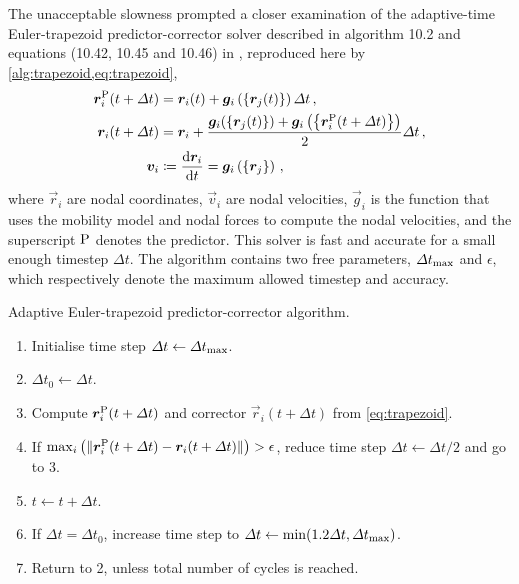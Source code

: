 The unacceptable slowness prompted a closer examination of the adaptive-time Euler-trapezoid predictor-corrector solver described in algorithm 10.2 and equations (10.42, 10.45 and 10.46) in \cite[p.~214--216]{ddlab}, reproduced here by \cref{alg:trapezoid,eq:trapezoid},
\begin{align}\label{eq:trapezoid}
    \vec{r}_i^{\rvar{P}}(t + \Delta t) & = \vec{r}_i(t) + \vec{g}_i\left(\left\{ \vec{r}_j(t) \right\}\right) \Delta t\,,                                                                     \\
    \vec{r}_i(t + \Delta t)            & = \vec{r}_i + \dfrac{\vec{g}_i(\left\{\vec{r}_j(t)\right\}) + \vec{g}_i\left(\left\{\vec{r}_i^{\rvar{P}}(t + \Delta t)\right\}\right)}{2}\Delta t\,, \\
    \vec{v}_i                          & \coloneqq \dfrac{\rvar{d}\vec{r}_i}{\rvar{d}t} = \vec{g}_i\left(\left\{\vec{r}_j\right\}\right)\,,
\end{align}
where $\vec{r}_i$ are nodal coordinates, $\vec{v}_i$ are nodal velocities, $\vec{g}_i$ is the function that uses the mobility model and nodal forces to compute the nodal velocities, and the superscript $\textrm{P}$ denotes the predictor. This solver is fast and accurate for a small enough timestep $\Delta t$. The algorithm contains two free parameters, $\Delta t_{\textrm{max}}$ and $\epsilon$, which respectively denote the maximum allowed timestep and accuracy.
\begin{algorithm}
    \caption{Adaptive Euler-trapezoid predictor-corrector algorithm.}
    \label{alg:trapezoid}
    \begin{enumerate}
        \item Initialise time step $\Delta t \gets \Delta t_{\textrm{max}}$.
        \item $\Delta t_0 \gets \Delta t$.
        \item Compute $\vec{r}_i^{\rvar{P}}(t + \Delta t)$ and corrector $\vec{r}_i(t + \Delta t)$ from \cref{eq:trapezoid}.
        \item If $\max_i\left(\lVert \vec{r}_i^{\rvar{P}}(t + \Delta t) - \vec{r}_i(t + \Delta t)\rVert\right) > \epsilon$, reduce time step $\Delta t \gets \Delta t / 2$ and go to 3.
        \item $t \gets t + \Delta t$.
        \item If $\Delta t = \Delta t_0$, increase time step to $\Delta t \gets \min(1.2 \Delta t, \Delta t_{\textrm{max}})$.
        \item Return to 2, unless total number of cycles is reached.
    \end{enumerate}
\end{algorithm}


